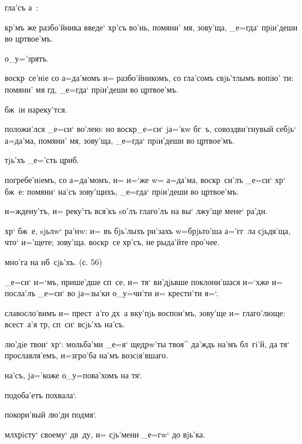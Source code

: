 гла'съ а~:%

кр'мъ же разбо'йника введе` хр'съ во'нь, помяни' 
мя, зову'ща, _е=гда` прiи'деши во цр твое'мъ.

о_у='зрятъ.

воскр~се'нiе со а=да'момъ и= разбо'йникомъ, со гла'сомъ 
свjь'тлымъ вопiю' ти: помяни' мя гд, _е=гда` прiи'деши 
во цр твое'мъ.

бж~iи нареку'тся.

положи'лся _е=си` во'лею: но воскр _е=си` jа='кw 
бг~ъ, совоздви'гнувый себjь` а=да'ма, помяни' мя, 
зову'ща, _е=гда` прiи'деши во цр твое'мъ.

тjь'хъ _е='сть цр нб.

погребе'нiемъ, со а=да'момъ, и= и=`же w= а=да'ма, 
воскр~си'лъ _е=си` хр` бж~е: помяни` на'съ зову'щихъ, 
_е=гда` прiи'деши во цр твое'мъ.

и=ждену'тъ, и= реку'тъ вся'къ sо'лъ глаго'лъ на вы` 
лжу'ще мене` ра'ди.

хр` бж~е, sjьлw` ра'нw: и= въ бjь'лыхъ ри'захъ 
w=брjьто'ша а='гг~ла сjьдя'ща, что` и='щете; зову'ща. 
воскр~се хр'съ, не рыда'йте про'чее.

мно'га на нб~сjь'хъ. (с. 56)

_е=си` и=`мъ, прише'дше сп~се, и= тя` ви'дjьвше 
поклони'шася и=`хже и= посла'лъ _е=си` во jа=зы'ки 
о_у=чи'ти и= крести'ти я=`.

славосло'вимъ и= прест~а'го дх~а вку'пjь воспои'мъ, 
зову'ще и= глаго'люще: всест~а'я тр, сп~си` всjь'хъ 
на'съ.

лю'дiе твои` хр`: мольба'ми _е=я` щедрw'ты твоя^ 
да'ждь на'мъ бл~гi'й, да тя` прославля'емъ, и=з\ъ гро'ба 
на'мъ возсiя'вшаго.

на'съ, jа='коже о_у=пова'хомъ на тя`.

подоба'етъ похвала`.

покори'вый лю'ди под\ъ мя`.

мл хрiсту` своему` дв~ду, и= сjь'мени _е=гw` до 
вjь'ка.
